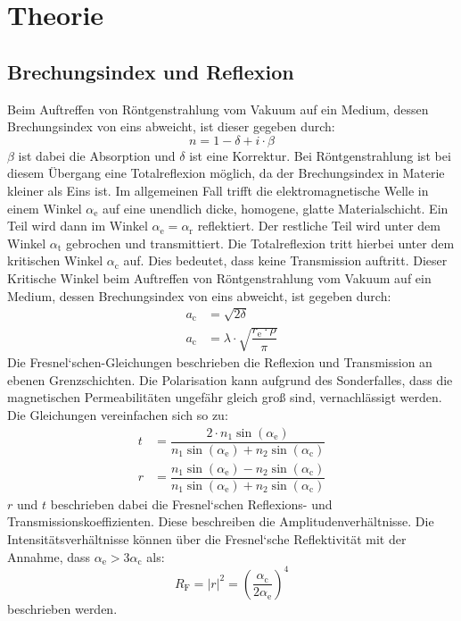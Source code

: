 
\section{Theorie}
\label{sec:Theorie}
\subsection{Brechungsindex und Reflexion}
\label{sec:Brechungsindex}
Beim Auftreffen von Röntgenstrahlung vom Vakuum auf ein Medium, dessen Brechungsindex von eins abweicht, ist dieser gegeben durch:
\begin{equation}
  \label{eqn:Brechungsindex}
  n=1-\delta+ i\cdot \beta
\end{equation}
$\beta$ ist dabei die Absorption und $\delta$ ist eine Korrektur. Bei Röntgenstrahlung ist bei diesem Übergang eine Totalreflexion möglich, da der Brechungsindex in Materie kleiner als Eins ist. Im allgemeinen Fall trifft die elektromagnetische Welle in einem Winkel $\alpha_\mathrm{e}$ auf eine unendlich dicke, homogene, glatte Materialschicht. Ein Teil wird dann im Winkel $\alpha_\mathrm{e}=\alpha_\mathrm{r}$ reflektiert. Der restliche Teil wird unter dem Winkel $\alpha_\mathrm{t}$ gebrochen und transmittiert. Die Totalreflexion tritt hierbei unter dem kritischen Winkel $\alpha_\mathrm{c}$ auf. Dies bedeutet, dass keine Transmission auftritt. Dieser Kritische Winkel beim Auftreffen von Röntgenstrahlung vom Vakuum auf ein Medium, dessen Brechungsindex von eins abweicht, ist gegeben durch:
\begin{align}
  \label{eqn:Totalreflexion}
  a_\mathrm{c} &= \sqrt{2 \delta} \\
  a_\mathrm{c} &= \lambda\cdot\sqrt{\dfrac{r_\mathrm{e}\cdot\rho}{\pi}}
\end{align}
Die Fresnel`schen-Gleichungen beschrieben die Reflexion und Transmission an ebenen Grenzschichten. Die Polarisation kann aufgrund des Sonderfalles, dass die magnetischen Permeabilitäten ungefähr gleich groß sind, vernachlässigt werden. Die Gleichungen vereinfachen sich so zu:
\begin{align}
  \label{eqn:Fresnelschen-Gleichungenl}
  t &= \dfrac{2\cdot n_\mathrm{1} \sin(\alpha_\mathrm{e}) }{n_\mathrm{1} \sin(\alpha_\mathrm{e})+ n_\mathrm{2} \sin(\alpha_\mathrm{c})}\\
  r &= \dfrac{n_\mathrm{1} \sin(\alpha_\mathrm{e})-n_\mathrm{2}\sin(\alpha_\mathrm{c})}{n_\mathrm{1}\sin(\alpha_\mathrm{e})+n_\mathrm{2} \sin(\alpha_\mathrm{c})}
\end{align}
$r$ und $t$ beschrieben dabei die Fresnel`schen Reflexions- und Transmissionskoeffizienten. Diese beschreiben die Amplitudenverhältnisse. Die Intensitätsverhältnisse können über die Fresnel`sche Reflektivität mit der Annahme, dass $\alpha_\mathrm{e} >3 \alpha_\mathrm{c}$ als:
\begin{equation}
  \label{eqn:Fresnelref}
 R_\mathrm{F} =|r|^2 =\left(\dfrac{\alpha_\mathrm{c}}{2\alpha_\mathrm{e}}\right)^4
\end{equation}
beschrieben werden.

